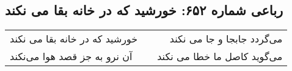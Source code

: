 \begin{center}
\section*{رباعی شماره ۶۵۲: خورشید که در خانه بقا می نکند}
\label{sec:0652}
\begin{longtable}{l p{0.5cm} r}
خورشید که در خانه بقا می نکند
&&
می‌گردد جابجا و جا می نکند
\\
آن نرو به جز قصد هوا می‌نکند
&&
می‌گوید کاصل ما خطا می نکند
\\
\end{longtable}
\end{center}
